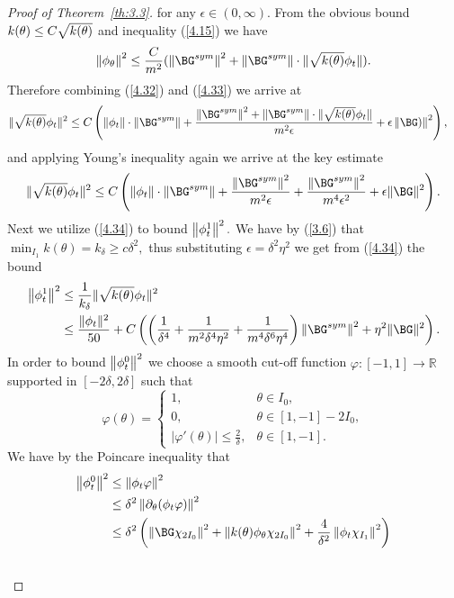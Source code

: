\begin{proof}[Proof of Theorem~{\ref{th:3.3}}]
for any $\epsilon\in (0,\infty)$. From the obvious bound $k(\theta)\leq C\sqrt{k(\theta)}$ and inequality (\ref{4.15}) we have 
\begin{equation}
\label{4.33}
\norm{\phi_\theta}^2\leq \frac{C}{m^2}(\norm{\BG^{sym}}^2+\norm{\BG^{sym}}\cdot \|{\sqrt{k(\theta)}}\phi_t\|).
\end{equation}
Therefore combining (\ref{4.32}) and (\ref{4.33}) we arrive at
\begin{align*}
\|\sqrt{k(\theta)}\phi_t\|^2
&\leq C\left(\norm{\phi_t}\cdot \norm{\BG^{sym}}+\frac{\norm{\BG^{sym}}^2+\norm{\BG^{sym}}\cdot \|{\sqrt{k(\theta)}}\phi_t\|}{m^2\epsilon}
+\epsilon\norm{\BG)}^2\right),
\end{align*}
and applying Young's inequality again we arrive at the key estimate
\begin{equation}
\label{4.34}
\|\sqrt{k(\theta)}\phi_t\|^2
\leq C\left( \norm{\phi_t}\cdot \norm{\BG^{sym}}+\frac{\norm{\BG^{sym}}^2}{m^2\epsilon}+\frac{\norm{\BG^{sym}}^2}{m^4\epsilon^2}+\epsilon\|\BG\|^2\right).\\
\end{equation}
Next we utilize (\ref{4.34}) to bound $\left\lVert \phi_t^1 \right\rVert^2.$ We have by (\ref{3.6}) that $\min_{I_1} k(\theta)=k_\delta\geq c\delta^2,$ thus substituting $\epsilon=\delta^2 \eta^2$ we get from (\ref{4.34}) the bound 
\begin{align}
\label{4.35}
    \norm{\phi_t^1}^2&\leq \frac{1}{k_\delta}\|\sqrt{k(\theta)}\phi_t\|^2\\ \nonumber
 &\leq \frac{\|\phi_t\|^2}{50}+C\left(\left(\frac{1}{\delta^4}+\frac{1}{m^2\delta^4 \eta^2}+
 \frac{1}{m^4\delta^6\eta^4}\right)\norm{\BG^{sym}}^2+\eta^2\|\BG\|^2\right).   
 \end{align}
In order to bound $\left\lVert \phi_t^0 \right\rVert^2$ we choose a smooth cut-off function $\varphi\colon [-1,1]\to\mathbb R$ supported in $[-2\delta,2\delta]$ such that 
$$
\varphi(\theta)=\begin{cases} 1, &\theta\in I_0,\\
					0, &\theta\in [1,-1]-2I_0, \\
|\varphi'(\theta)|\leq\frac{2}{\delta}, & \theta\in [1,-1].	      
\end{cases}
$$
We have by the Poincare inequality that  
\begin{align}
\label{4.36}
\norm{\phi^0_t}^2 &\leq \norm{\phi_t \varphi}^2\\  \nonumber
&\leq \delta^2 \norm{\partial_\Gth(\phi_t \varphi)}^2\\  \nonumber
&\leq \delta^2\left(\norm{\BG \chi_ {2I_0}}^2+\norm{k(\theta) \phi_\theta \chi_ {2I_0}}^2+\frac{4}{\delta^2}\norm{\phi_t\chi_ {I_1}}^2\right)\\ \nonumber

\end{align}
\end{proof}
